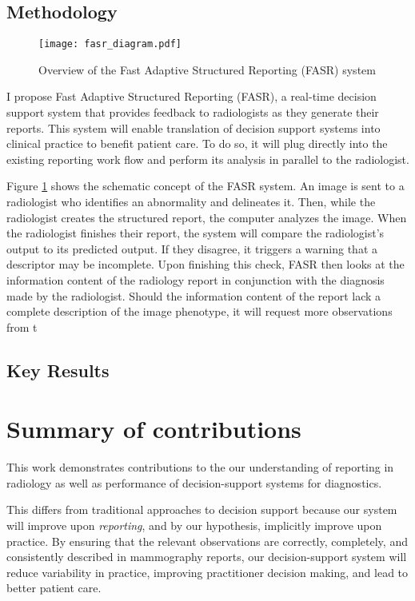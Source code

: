 \subsection{Methodology}

\begin{figure}[h]
	\centering
	\texttt{[image: fasr\_diagram.pdf]}
	\caption{Overview of the Fast Adaptive Structured Reporting (FASR) system}
	\label{fig:fasr_diagram}
\end{figure}

I propose Fast Adaptive Structured Reporting (FASR), a real-time decision support system that provides feedback to radiologists as they generate their reports. This system will enable translation of decision support systems into clinical practice to benefit patient care. To do so, it will plug directly into the existing reporting work flow and perform its analysis in parallel to the radiologist.

Figure \ref{fig:fasr_diagram} shows the schematic concept of the FASR system. An image is sent to a radiologist who identifies an abnormality and delineates it. Then, while the radiologist creates the structured report, the computer analyzes the image. When the radiologist finishes their report, the system will compare the radiologist's output to its predicted output. If they disagree, it triggers a warning that a descriptor may be incomplete. Upon finishing this check, FASR then looks at the information content of the radiology report in conjunction with the diagnosis made by the radiologist. Should the information content of the report lack a complete description of the image phenotype, it will request more observations from t
\subsection{Key Results}


\section{Summary of contributions}
This work demonstrates contributions to the our understanding of reporting in radiology as well as performance of decision-support systems for diagnostics.

This differs from traditional approaches to decision support because our system will improve upon \emph{reporting}, and by our hypothesis, implicitly improve upon practice. By ensuring that the relevant observations are correctly, completely, and consistently described in mammography reports, our decision-support system will reduce variability in practice, improving practitioner decision making, and lead to better patient care.

